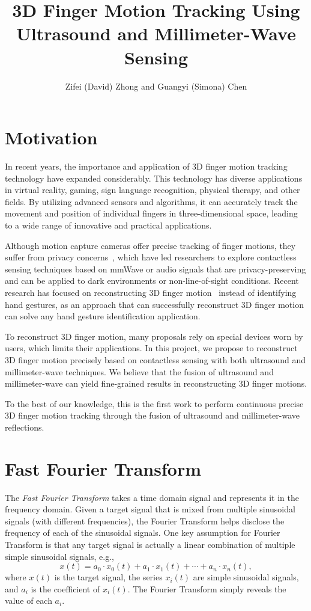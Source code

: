 \documentclass[11pt, oneside]{article}   	%
\title{3D Finger Motion Tracking Using Ultrasound and Millimeter-Wave Sensing}
\author{Zifei (David) Zhong and Guangyi (Simona) Chen}
\begin{document}
\maketitle

\section{Motivation}
In recent years, the importance and application of 3D finger motion tracking technology have expanded considerably. This technology has diverse applications in virtual reality, gaming, sign language recognition, physical therapy, and other fields. By utilizing advanced sensors and algorithms, it can accurately track the movement and position of individual fingers in three-dimensional space, leading to a wide range of innovative and practical applications.

Although motion capture cameras offer precise tracking of finger motions, they suffer from privacy concerns~\cite{ref:cameraprivacy18}, which have led researchers to explore contactless sensing techniques based on mmWave or audio signals that are privacy-preserving and can be applied to dark environments or non-line-of-sight conditions. Recent research has focused on reconstructing 3D finger motion~\cite{ref:neuropose21, ref:sslotr22, ref:mm4arm23} instead of identifying hand gestures, as an approach that can successfully reconstruct 3D finger motion can solve any hand gesture identification application.

To reconstruct 3D finger motion, many proposals rely on special devices worn by users, which limits their applications. In this project, we propose to reconstruct 3D finger motion precisely based on contactless sensing with both ultrasound and millimeter-wave techniques. We believe that the fusion of ultrasound and millimeter-wave can yield fine-grained results in reconstructing 3D finger motions.

To the best of our knowledge, this is the first work to perform continuous precise 3D finger motion tracking through the fusion of ultrasound and millimeter-wave reflections.

\section{Fast Fourier Transform}
The \emph{Fast Fourier Transform} takes a time domain signal and represents it in the frequency domain. Given a target signal that is mixed from multiple sinusoidal signals (with different frequencies), the Fourier Transform helps disclose the frequency of each of the sinusoidal signals. One key assumption for Fourier Transform is that any target signal is actually a linear combination of multiple simple sinusoidal signals, e.g., 
$$x(t) = a_0 \cdot x_0(t) + a_1 \cdot x_1(t) + \cdots + a_n \cdot x_n(t),$$
where $x(t)$ is the target signal, the series $x_i(t)$ are simple sinusoidal signals, and $a_i$ is the coefficient of $x_i(t)$. The Fourier Transform simply reveals the value of each $a_i$.
\end{document}
